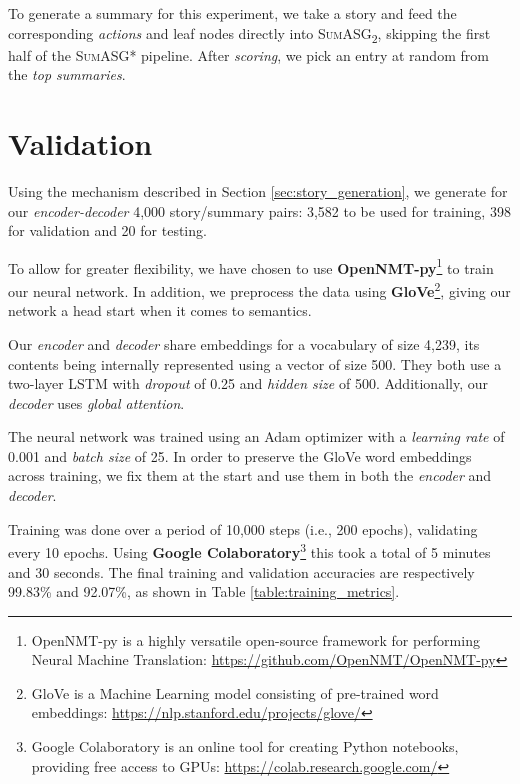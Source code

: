 To generate a summary for this experiment, we take a story and feed the corresponding \textit{actions} and leaf nodes directly into \textsc{SumASG\textsubscript{2}}, skipping the first half of the \textsc{SumASG*} pipeline. After \textit{scoring}, we pick an entry at random from the \textit{top summaries}.

\section{Validation}
\label{sec:validation}

Using the mechanism described in Section \ref{sec:story_generation}, we generate for our \textit{encoder-decoder} 4,000 story/summary pairs: 3,582 to be used for training, 398 for validation and 20 for testing.

To allow for greater flexibility, we have chosen to use \textbf{OpenNMT-py}\footnote{OpenNMT-py is a highly versatile open-source framework for performing Neural Machine Translation: \url{https://github.com/OpenNMT/OpenNMT-py}} to train our neural network. In addition, we preprocess the data using \textbf{GloVe}\footnote{GloVe is a Machine Learning model consisting of pre-trained word embeddings: \url{https://nlp.stanford.edu/projects/glove/}}, giving our network a head start when it comes to semantics.

Our \textit{encoder} and \textit{decoder} share embeddings for a vocabulary of size 4,239, its contents being internally represented using a vector of size 500. They both use a two-layer LSTM with \textit{dropout} of 0.25 and \textit{hidden size} of 500. Additionally, our \textit{decoder} uses \textit{global attention}.

The neural network was trained using an Adam optimizer with a \textit{learning rate} of 0.001 and \textit{batch size} of 25. In order to preserve the GloVe word embeddings across training, we fix them at the start and use them in both the \textit{encoder} and \textit{decoder}.

Training was done over a period of 10,000 steps (i.e., 200 epochs), validating every 10 epochs. Using \textbf{Google Colaboratory}\footnote{Google Colaboratory is an online tool for creating Python notebooks, providing free access to GPUs: \url{https://colab.research.google.com/}} this took a total of 5 minutes and 30 seconds. The final training and validation accuracies are respectively 99.83\% and 92.07\%, as shown in Table \ref{table:training_metrics}.

